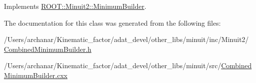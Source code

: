 Implements \mbox{\hyperlink{classROOT_1_1Minuit2_1_1MinimumBuilder_aefaa624436afa8195af1f3393a35981f}{R\+O\+O\+T\+::\+Minuit2\+::\+Minimum\+Builder}}.



The documentation for this class was generated from the following files\+:\begin{DoxyCompactItemize}
\item 
/\+Users/archanar/\+Kinematic\+\_\+factor/adat\+\_\+devel/other\+\_\+libs/minuit/inc/\+Minuit2/\mbox{\hyperlink{other__libs_2minuit_2inc_2Minuit2_2CombinedMinimumBuilder_8h}{Combined\+Minimum\+Builder.\+h}}\item 
/\+Users/archanar/\+Kinematic\+\_\+factor/adat\+\_\+devel/other\+\_\+libs/minuit/src/\mbox{\hyperlink{CombinedMinimumBuilder_8cxx}{Combined\+Minimum\+Builder.\+cxx}}\end{DoxyCompactItemize}
